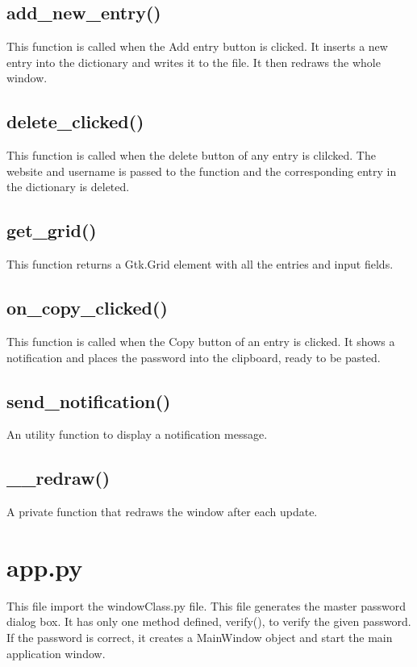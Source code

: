 \documentclass[draft,10pt,a4paper,titlepage]{report}
\begin{document}
\subsection{add\_new\_entry()}
\newline\par This function is called when the Add entry button is clicked. It inserts a new entry into the dictionary and writes it to the file. It then redraws the whole window. 
\subsection{delete\_clicked()}
\newline\par This function is called when the delete button of any entry is clilcked. The website and username is passed to the function and the corresponding entry in the dictionary is deleted.
\subsection{get\_grid()}
\newline\par This function returns a Gtk.Grid element with all the entries and input fields. 
\subsection{on\_copy\_clicked()}
\newline\par This function is called when the Copy button of an entry is clicked. It shows a notification and places the password into the clipboard, ready to be pasted.
\subsection{send\_notification()}
\newline\par An utility function to display a notification message.
\subsection{\_\_redraw()}
\newline\par A private function that redraws the window after each update. 

\section{app.py}
\newline\par This file import the windowClass.py file. This file generates the master password dialog box. It has only one method defined, verify(), to verify the given password. If the password is correct, it creates a MainWindow object and start the main application window. 
\end{document}
